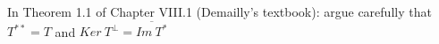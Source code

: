 \documentclass[../main.tex]{subfiles}
\begin{document}
\begin{problem}
In Theorem 1.1 of Chapter VIII.1 (Demailly's textbook): argue carefully that  $T^{**}=T$ and $Ker \  T^\perp = \overline{Im \ T^*}$
\end{problem}
\end{document}
